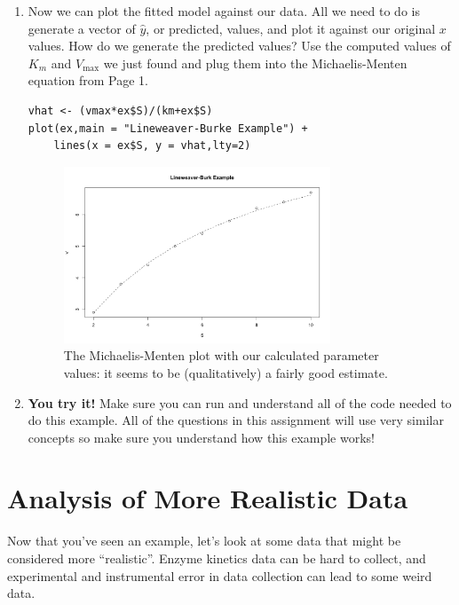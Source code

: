 \documentclass[11pt]{article}
\newcommand{\np}{\vfill\newpage}
\begin{document}
\begin{enumerate}
	\item Now we can plot the fitted model against our data. All we need to do is generate a vector of \(\hat{y}\), or predicted, values, and plot it against our original \(x\) values. How do we generate the predicted values? Use the computed values of \(K_m\) and \(V_{\mathrm{max}}\) we just found and plug them into the Michaelis-Menten equation from Page 1.
	
	\np
	
	\begin{lstlisting}
vhat <- (vmax*ex$S)/(km+ex$S)
plot(ex,main = "Lineweaver-Burke Example") +
	lines(x = ex$S, y = vhat,lty=2)
	\end{lstlisting}
	
	\begin{figure}[h!]
	\centering
	\includegraphics[width=0.75\textwidth]{Ex_Final.png}
	\caption{The Michaelis-Menten plot with our calculated parameter values: it seems to be (qualitatively) a fairly good estimate.}
	\label{Fig:ExFinalPlot}
	\end{figure}		
	
	\item {\bf You try it!} Make sure you can run and understand all of the code needed to do this example. All of the questions in this assignment will use very similar concepts so make sure you understand how this example works!
		
\end{enumerate}

\np

\section*{Analysis of More Realistic Data}
Now that you've seen an example, let's look at some data that might be considered more ``realistic''. Enzyme kinetics data can be hard to collect, and experimental and instrumental error in data collection can lead to some weird data.
\end{document}
